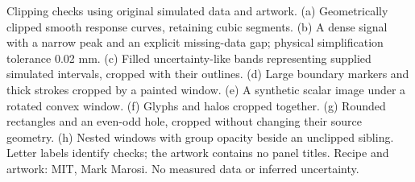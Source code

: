 \caption{Clipping checks using original simulated data and artwork. (a) Geometrically clipped smooth response curves, retaining cubic segments. (b) A dense signal with a narrow peak and an explicit missing-data gap; physical simplification tolerance 0.02 mm. (c) Filled uncertainty-like bands representing supplied simulated intervals, cropped with their outlines. (d) Large boundary markers and thick strokes cropped by a painted window. (e) A synthetic scalar image under a rotated convex window. (f) Glyphs and halos cropped together. (g) Rounded rectangles and an even-odd hole, cropped without changing their source geometry. (h) Nested windows with group opacity beside an unclipped sibling. Letter labels identify checks; the artwork contains no panel titles. Recipe and artwork: MIT, Mark Marosi. No measured data or inferred uncertainty.}
